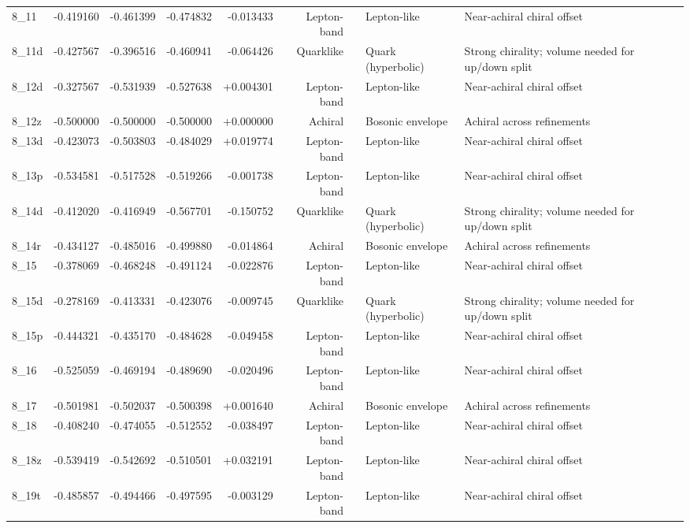 \documentclass[smallextended]{svjour3}       %
\begin{document}
\begin{longtable}{lrrrrrllp{6.8cm}}
    8\_11 & -0.419160 & -0.461399 & -0.474832 & -0.013433 & Lepton-band &  & Lepton-like & Near-achiral chiral offset \\
    8\_11d & -0.427567 & -0.396516 & -0.460941 & -0.064426 & Quarklike &  & Quark (hyperbolic) & Strong chirality; volume needed for up/down split \\
    8\_12d & -0.327567 & -0.531939 & -0.527638 & +0.004301 & Lepton-band &  & Lepton-like & Near-achiral chiral offset \\
    8\_12z & -0.500000 & -0.500000 & -0.500000 & +0.000000 & Achiral &  & Bosonic envelope & Achiral across refinements \\
    8\_13d & -0.423073 & -0.503803 & -0.484029 & +0.019774 & Lepton-band &  & Lepton-like & Near-achiral chiral offset \\
    8\_13p & -0.534581 & -0.517528 & -0.519266 & -0.001738 & Lepton-band &  & Lepton-like & Near-achiral chiral offset \\
    8\_14d & -0.412020 & -0.416949 & -0.567701 & -0.150752 & Quarklike &  & Quark (hyperbolic) & Strong chirality; volume needed for up/down split \\
    8\_14r & -0.434127 & -0.485016 & -0.499880 & -0.014864 & Achiral &  & Bosonic envelope & Achiral across refinements \\
    8\_15 & -0.378069 & -0.468248 & -0.491124 & -0.022876 & Lepton-band &  & Lepton-like & Near-achiral chiral offset \\
    8\_15d & -0.278169 & -0.413331 & -0.423076 & -0.009745 & Quarklike &  & Quark (hyperbolic) & Strong chirality; volume needed for up/down split \\
    8\_15p & -0.444321 & -0.435170 & -0.484628 & -0.049458 & Lepton-band &  & Lepton-like & Near-achiral chiral offset \\
    8\_16 & -0.525059 & -0.469194 & -0.489690 & -0.020496 & Lepton-band &  & Lepton-like & Near-achiral chiral offset \\
    8\_17 & -0.501981 & -0.502037 & -0.500398 & +0.001640 & Achiral &  & Bosonic envelope & Achiral across refinements \\
    8\_18 & -0.408240 & -0.474055 & -0.512552 & -0.038497 & Lepton-band &  & Lepton-like & Near-achiral chiral offset \\
    8\_18z & -0.539419 & -0.542692 & -0.510501 & +0.032191 & Lepton-band &  & Lepton-like & Near-achiral chiral offset \\
    8\_19t & -0.485857 & -0.494466 & -0.497595 & -0.003129 & Lepton-band &  & Lepton-like & Near-achiral chiral offset \\

\end{longtable}
\end{document}
